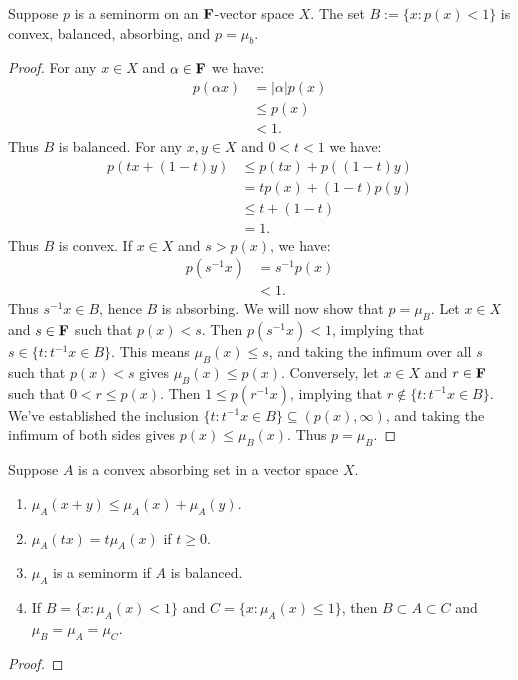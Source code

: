 \begin{proposition}
	Suppose $p$ is a seminorm on an $\mathbf{F}$-vector space $X$. The set $B := \{x : p(x) < 1\}$ is convex, balanced, absorbing, and $p = \mu_b$.
\end{proposition}
	\begin{proof}
		For any $x \in X$ and $\alpha \in \mathbf{F}$ we have:
		\begin{align*}
			p(\alpha x) 
			& = |\alpha|p(x) \\
			&\leq p(x) \\ 
			& < 1.
		\end{align*}
		Thus $B$ is balanced. For any $x,y \in X$ and $0 < t < 1$ we have:
		\begin{align*}
			p(tx + (1-t)y)
			& \leq p(tx) + p((1-t)y) \\
			&= tp(x) + (1-t)p(y) \\
			&\leq t + (1-t)  \\
			&= 1.
		\end{align*}
		Thus $B$ is convex. If $x \in X$ and $s > p(x)$, we have:
		\begin{align*}
			p(s^{-1}x)
			&= s^{-1}p(x)\\
			&< 1.
		\end{align*}
		Thus $s^{-1}x \in B$, hence $B$ is absorbing. We will now show that $p = \mu_B$. Let $x \in X$ and $s \in \mathbf{F}$ such that $p(x) < s$. Then $p(s^{-1}x) < 1$, implying that $s \in \{t : t^{-1}x \in B\}$. This means $\mu_B(x) \leq s$, and taking the infimum over all $s$ such that $p(x) < s$ gives $\mu_B(x) \leq p(x)$. Conversely, let $x \in X$ and $r \in \mathbf{F}$ such that $0 < r \leq p(x)$. Then $1 \leq p(r^{-1}x)$, implying that $r \not\in \{t : t^{-1} x \in B\}$. We've established the inclusion $\{t:t^{-1}x \in B\} \subseteq (p(x),\infty)$, and taking the infimum of both sides gives $p(x) \leq \mu_B(x)$. Thus $p = \mu_B$.
	\end{proof}

\begin{theorem}
	Suppose $A$ is a convex absorbing set in a vector space $X$. 
	\mbox{}
	\begin{enumerate}[label = (\alph*),itemsep=1pt,topsep=3pt]
		\item $\mu_A(x+y) \leq \mu_A(x) + \mu_A(y)$.
		\item $\mu_A(tx) = t \mu_A(x)$ if $t \geq 0$.
		\item $\mu_A$ is a seminorm if $A$ is balanced.
		\item If $B = \{x : \mu_A(x) < 1\}$ and $C = \{x : \mu_A(x) \leq 1\}$, then $B \subset A \subset C$ and $\mu_B = \mu_A = \mu_C$.
	\end{enumerate}
\end{theorem}
	{\color{red}
	\begin{proof}
			
	\end{proof}}

